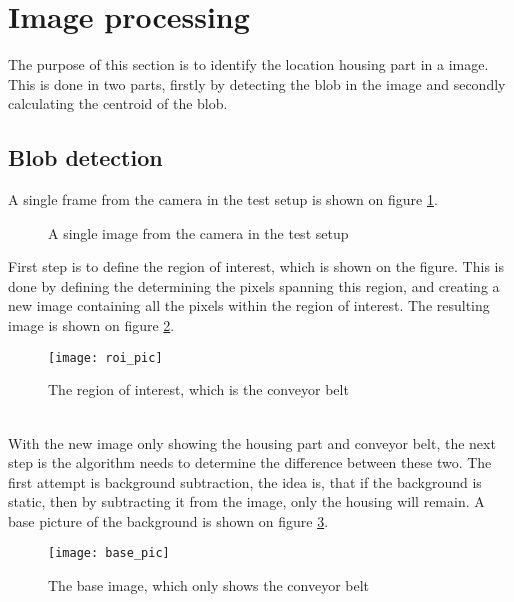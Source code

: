 \section{Image processing}\label{sec_image_processing}
The purpose of this section is to identify the location housing part in a image. This is done in two parts, firstly by detecting the blob in the image and secondly calculating the centroid of the blob.

\subsection{Blob detection}\label{sub_blob_detection}
A single frame from the camera in the test setup is shown on figure \ref{fig_clean_pic}.
\begin{figure}[htpb!]
	\centering
{}
	
	\caption{A single image from the camera in the test setup}
	\label{fig_clean_pic}
\end{figure}\newline
First step is to define the region of interest, which is shown on the figure. This is done by defining the determining the pixels spanning this region, and creating a new image containing all the pixels within the region of interest. The resulting image is shown on figure \ref{fig_roi}.
\begin{figure}[htbp]
	\centering
	\texttt{[image: roi\_pic]}
	\caption{The region of interest, which is the conveyor belt}
	\label{fig_roi}
\end{figure}  \\
With the new image only showing the housing part and conveyor belt, the next step is the algorithm needs to determine the difference between these two. The first attempt is background subtraction, the idea is, that if the background is static, then by subtracting it from the image, only the housing will remain. A base picture of the background is shown on figure \ref{fig_base}.
\begin{figure}[htbp]
	\centering
	\texttt{[image: base\_pic]}
	\caption{The base image, which only shows the conveyor belt}
	\label{fig_base}
\end{figure}  \\
